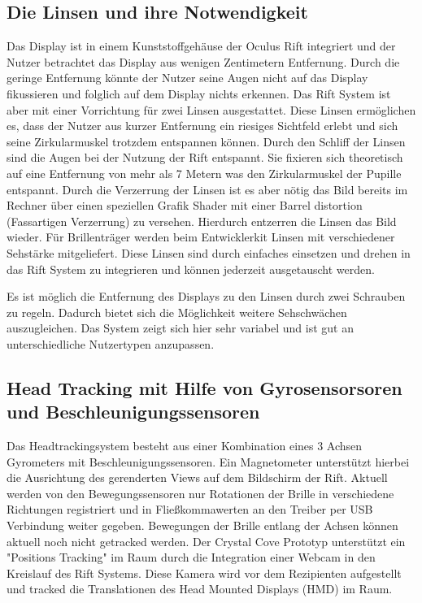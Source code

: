 \documentclass[pagesize, paper=a4, fontsize=12pt,titlepage=true, headings=small, headnosepline, abstractoff, liststotoc, nochapterprefix, plainheadsepline]{scrreprt}
\begin{document}
\subsection{Die Linsen und ihre Notwendigkeit}
Das Display ist in einem Kunststoffgehäuse der Oculus Rift integriert und der Nutzer betrachtet das Display aus wenigen Zentimetern Entfernung. Durch die geringe Entfernung könnte der Nutzer seine Augen nicht auf das Display fikussieren und folglich auf dem Display nichts erkennen. Das Rift System ist aber mit einer Vorrichtung für zwei Linsen ausgestattet. Diese Linsen ermöglichen es, dass der Nutzer aus kurzer Entfernung ein riesiges Sichtfeld erlebt und sich seine Zirkularmuskel trotzdem entspannen können. Durch den Schliff der Linsen sind die Augen bei der Nutzung der Rift entspannt. Sie fixieren sich theoretisch auf eine Entfernung von mehr als 7 Metern was den Zirkularmuskel der Pupille entspannt. Durch die Verzerrung der Linsen ist es aber nötig das Bild bereits im Rechner über einen speziellen Grafik Shader mit einer Barrel distortion (Fassartigen Verzerrung) zu versehen. Hierdurch entzerren die Linsen das Bild wieder. Für Brillenträger werden beim Entwicklerkit Linsen mit verschiedener Sehstärke mitgeliefert. Diese Linsen sind durch einfaches einsetzen und drehen in das Rift System zu integrieren und können jederzeit ausgetauscht werden.

Es ist möglich die Entfernung des Displays zu den Linsen durch zwei Schrauben zu regeln. Dadurch bietet sich die Möglichkeit weitere Sehschwächen auszugleichen. Das System zeigt sich hier sehr variabel und ist gut an unterschiedliche Nutzertypen anzupassen.

\subsection{Head Tracking mit Hilfe von Gyrosensorsoren  und Beschleunigungssensoren}
Das Headtrackingsystem besteht aus einer Kombination eines 3 Achsen Gyrometers mit Beschleunigungssensoren. Ein Magnetometer unterstützt hierbei die Ausrichtung des gerenderten Views auf dem Bildschirm der Rift. Aktuell werden von den Bewegungssensoren nur Rotationen der Brille in verschiedene Richtungen registriert und in Fließkommawerten an den Treiber per USB Verbindung weiter gegeben. Bewegungen der Brille entlang der Achsen können aktuell noch nicht getracked werden. Der Crystal Cove Prototyp unterstützt ein "Positions Tracking" im Raum durch die Integration einer Webcam in den Kreislauf des Rift Systems. Diese Kamera wird vor dem Rezipienten aufgestellt und tracked die Translationen des Head Mounted Displays (HMD) im Raum.
\\
\end{document}
